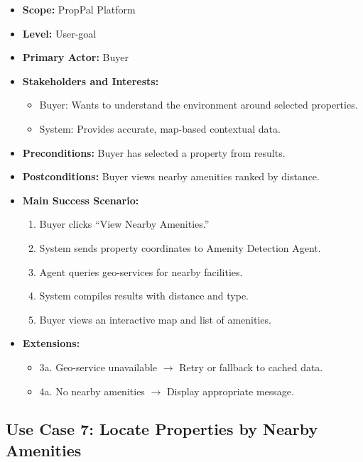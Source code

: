\begin{itemize}
    \item \textbf{Scope:} PropPal Platform
    \item \textbf{Level:} User-goal
    \item \textbf{Primary Actor:} Buyer
    \item \textbf{Stakeholders and Interests:}
    \begin{itemize}
        \item Buyer: Wants to understand the environment around selected properties.
        \item System: Provides accurate, map-based contextual data.
    \end{itemize}
    \item \textbf{Preconditions:} Buyer has selected a property from results.
    \item \textbf{Postconditions:} Buyer views nearby amenities ranked by distance.
    \item \textbf{Main Success Scenario:}
    \begin{enumerate}
        \item Buyer clicks ``View Nearby Amenities.''
        \item System sends property coordinates to Amenity Detection Agent.
        \item Agent queries geo-services for nearby facilities.
        \item System compiles results with distance and type.
        \item Buyer views an interactive map and list of amenities.
    \end{enumerate}
    \item \textbf{Extensions:}
    \begin{itemize}
        \item 3a. Geo-service unavailable $\rightarrow$ Retry or fallback to cached data.
        \item 4a. No nearby amenities $\rightarrow$ Display appropriate message.
    \end{itemize}
\end{itemize}

\subsection{Use Case 7: Locate Properties by Nearby Amenities}

